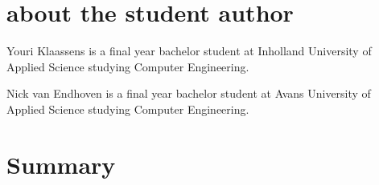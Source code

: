 \documentclass[10pt]{article}
\begin{document}
\section*{about the student author}
Youri Klaassens is a final year bachelor student at Inholland University of Applied Science studying Computer Engineering.

Nick van Endhoven is a final year bachelor student at Avans University of Applied Science studying Computer Engineering.

\section{Summary}
\end{document}

